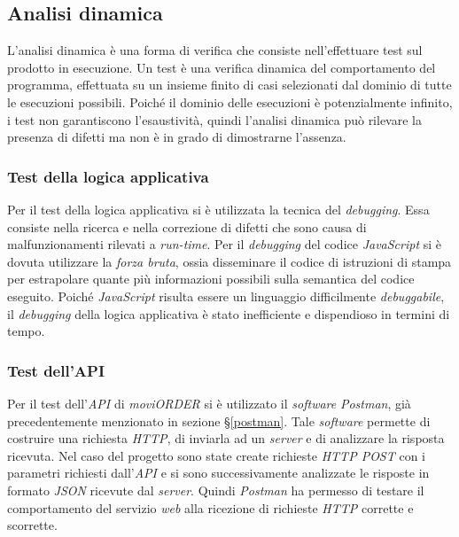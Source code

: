 \subsection{Analisi dinamica}

L'analisi dinamica è una forma di verifica che consiste nell'effettuare test sul prodotto in esecuzione. Un test è una verifica dinamica del comportamento del programma, effettuata su un insieme finito di casi selezionati dal dominio di tutte le esecuzioni possibili. Poiché il dominio delle esecuzioni è potenzialmente infinito, i test non garantiscono l'esaustività, quindi l'analisi dinamica può rilevare la presenza di difetti ma non è in grado di dimostrarne l'assenza.

\subsubsection{Test della logica applicativa}

Per il test della logica applicativa si è utilizzata la tecnica del \textit{debugging}. Essa consiste nella ricerca e nella correzione di difetti che sono causa di malfunzionamenti rilevati a \textit{run-time}. Per il \textit{debugging} del codice \textit{JavaScript} si è dovuta utilizzare la \textit{forza bruta}, ossia disseminare il codice di istruzioni di stampa per estrapolare quante più informazioni possibili sulla semantica del codice eseguito. Poiché \textit{JavaScript} risulta essere un linguaggio difficilmente \textit{debuggabile}, il \textit{debugging} della logica applicativa è stato inefficiente e dispendioso in termini di tempo.

\subsubsection{Test dell'API}

Per il test dell'\textit{API} di \textit{moviORDER} si è utilizzato il \textit{software} \textit{Postman}, già precedentemente menzionato in sezione §\ref{postman}. Tale \textit{software} permette di costruire una richiesta \textit{HTTP}, di inviarla ad un \textit{server} e di analizzare la risposta ricevuta. Nel caso del progetto sono state create richieste \textit{HTTP POST} con i parametri richiesti dall'\textit{API} e si sono successivamente analizzate le risposte in formato \textit{JSON} ricevute dal \textit{server}.
Quindi \textit{Postman} ha permesso di testare il comportamento del servizio \textit{web} alla ricezione di richieste \textit{HTTP} corrette e scorrette.

